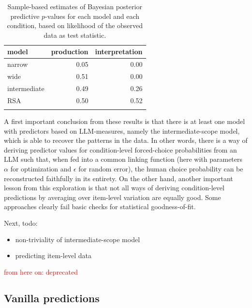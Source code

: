 \documentclass{article}
\begin{document}
\begin{table}[ht]
\centering

\begin{tabular}{lrr}
  \toprule
  model        & production & interpretation \\ \midrule
  narrow       & 0.05       & 0.00 \\
  wide         & 0.51       & 0.00 \\
  intermediate & 0.49       & 0.26 \\
  RSA          & 0.50       & 0.52 \\
  \bottomrule \\
\end{tabular}

\caption{Sample-based estimates of Bayesian posterior predictive $p$-values for each model and each condition, based on likelihood of the observed data as test statistic.}
\label{tab:Bppp-values}
\end{table}

A first important conclusion from these results is that there is at least one model with predictors based on LLM-measures, namely the intermediate-scope model, which is able to recover the patterns in the data.
In other words, there is a way of deriving predictor values for condition-level forced-choice probabilities from an LLM such that, when fed into a common linking function (here with parameters $\alpha$ for optimization and $\epsilon$ for random error), the human choice probability can be reconstructed faithfully in its entirety.
On the other hand, another important lesson from this exploration is that not all ways of deriving condition-level predictions by averaging over item-level variation are equally good.
Some approaches clearly fail basic checks for statistical goodness-of-fit.


\bigskip

Next, todo:

\begin{itemize}
  \item non-triviality of intermediate-scope model
  \item predicting item-level data
\end{itemize}


\newpage

\textcolor{red}{from here on: deprecated}


\subsection{Vanilla predictions}
\label{sec:vanilla-predictions}
\end{document}
